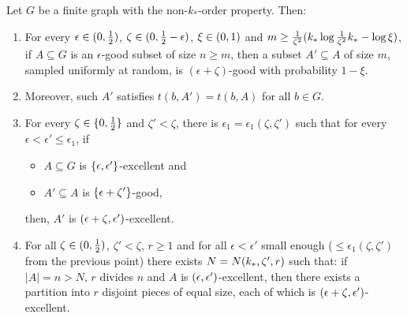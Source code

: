         \begin{lemma} \label{lem:even_partition_of_excellent_parts}
            Let $G$ be a finite graph with the non-$k_{*}$-order property.
            Then:
            \begin{enumerate}[label=(\alph*), ref=\alph*]
                \item \label{itm:even_partition_of_excellent_parts.1} For every $\epsilon \in ( 0, \frac{1}{2} )$,
                    $\zeta \in ( 0, \frac{1}{2} - \epsilon )$, $\xi \in ( 0, 1 )$ and
                    $m \geq \frac{1}{\zeta^2}( k_* \log{\frac{1}{\zeta^2}k_*} - \log{\xi} )$,
                    if $A \subseteq G$ is an $\epsilon$-good subset of size $n \geq m$,
                    then a subset $A' \subseteq A$ of size $m$, sampled uniformly at random, is $(\epsilon + \zeta)$-good with probability $1-\xi$.
                \item \label{itm:even_partition_of_excellent_parts.1*} Moreover, such $A'$ satisfies $t(b, A') = t(b, A)$ for all $b \in G$.
                \item \label{itm:even_partition_of_excellent_parts.2} For every $\zeta \in \{ 0, \frac{1}{2} \}$ and $\zeta' < \zeta$, there is
                    $\epsilon_1 = \epsilon_1(\zeta, \zeta')$ such that for every $\epsilon < \epsilon' \leq \epsilon_1$, if
                    \begin{itemize}
                        \item $A \subseteq G$ is $\{ \epsilon, \epsilon' \}$-excellent and
                        \item $A' \subseteq A$ is $\{ \epsilon + \zeta' \}$-good,
                    \end{itemize}
                    then, $A'$ is $( \epsilon + \zeta, \epsilon' )$-excellent.
                \item \label{itm:even_partition_of_excellent_parts.3} For all $\zeta \in ( 0, \frac{1}{2} )$, $\zeta' < \zeta$, $r \geq 1$ and for all
                    $\epsilon < \epsilon'$ small enough ($\leq \epsilon_1(\zeta, \zeta')$ from the previous point) there exists
                    $N = N( k_{*}, \zeta', r )$ such that: if $|A| = n > N$, $r$ divides $n$ and $A$ is
                    $( \epsilon, \epsilon' )$-excellent, then there exists a partition into $r$ disjoint pieces of equal
                    size, each of which is $( \epsilon + \zeta, \epsilon' )$-excellent.

\end{enumerate}
\end{lemma}
